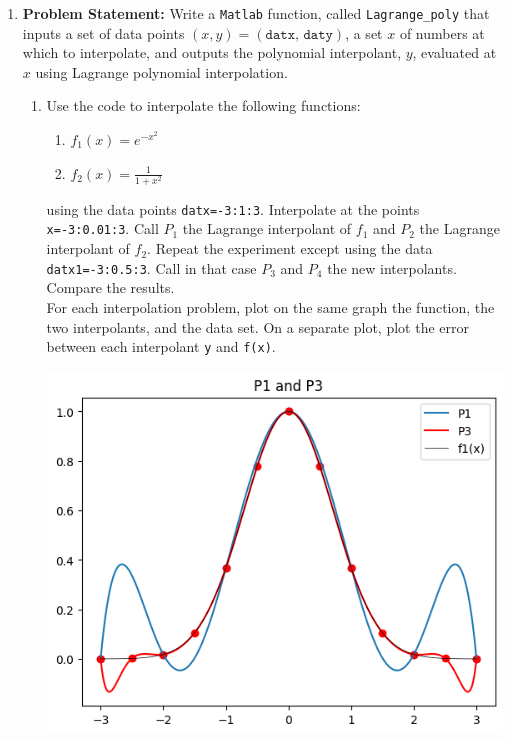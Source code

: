 \documentclass[12pt,twoside]{amsart}
\begin{document}
\begin{enumerate}
    \item\textbf{Problem Statement:} Write a \texttt{Matlab} function, called \texttt{Lagrange\_poly} that inputs a set of data points $(x, y) = (\texttt{datx, daty})$, a set $x$ of numbers at which to interpolate, and outputs the polynomial interpolant, $y$, evaluated at $x$ using Lagrange polynomial interpolation.
    \begin{enumerate}
        \item Use the code to interpolate the following functions:
        \begin{enumerate}
            \item $f_1(x) = e^{-x^2}$
            \item $f_2(x) = \frac{1}{1 + x^2}$
        \end{enumerate}
        using the data points \texttt{datx=-3:1:3}. Interpolate at the points \texttt{x=-3:0.01:3}. Call $P_1$ the Lagrange interpolant of $f_1$ and $P_2$ the Lagrange interpolant of $f_2$. Repeat the experiment except using the data \texttt{datx1=-3:0.5:3}. Call in that case $P_3$ and $P_4$ the new interpolants. Compare the results. \\
        For each interpolation problem, plot on the same graph the function, the two interpolants, and the data set. On a separate plot, plot the error between each interpolant \texttt{y} and \texttt{f(x)}.
        
        \begin{paracol}{2}
            \includegraphics[scale=0.45]{../img/problem6P1P3.png} \\

\end{paracol}
\end{enumerate}
\end{enumerate}
\end{document}
